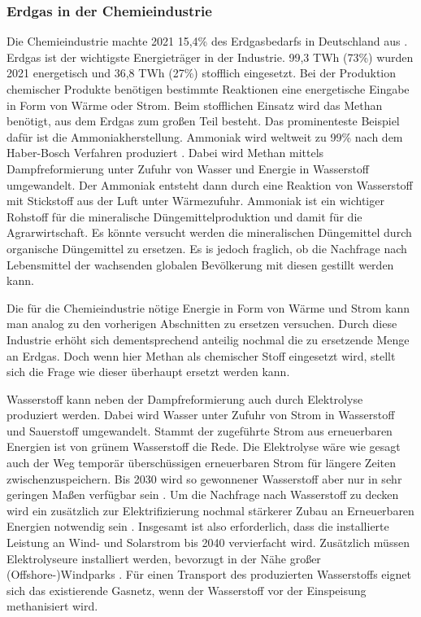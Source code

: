 \subsubsection{Erdgas in der Chemieindustrie}

Die Chemieindustrie machte 2021 15,4\% des Erdgasbedarfs in Deutschland aus \cite{vci2022}. Erdgas ist der wichtigste Energieträger in der Industrie. 99,3 TWh (73\%) wurden 2021 energetisch und 36,8 TWh (27\%) stofflich eingesetzt. Bei der Produktion chemischer Produkte benötigen bestimmte Reaktionen eine energetische Eingabe in Form von Wärme oder Strom. Beim stofflichen Einsatz wird das Methan benötigt, aus dem Erdgas zum großen Teil besteht. Das prominenteste Beispiel dafür ist die Ammoniakherstellung. Ammoniak wird weltweit zu 99\% nach dem Haber-Bosch Verfahren produziert \cite{smil}. Dabei wird Methan mittels Dampfreformierung unter Zufuhr von Wasser und Energie in Wasserstoff umgewandelt. Der Ammoniak entsteht dann durch eine Reaktion von Wasserstoff mit Stickstoff aus der Luft unter Wärmezufuhr. Ammoniak ist ein wichtiger Rohstoff für die mineralische Düngemittelproduktion und damit für die Agrarwirtschaft. Es könnte versucht werden die mineralischen Düngemittel durch organische Düngemittel zu ersetzen. Es is jedoch fraglich, ob die Nachfrage nach Lebensmittel der wachsenden globalen Bevölkerung mit diesen gestillt werden kann.

Die für die Chemieindustrie nötige Energie in Form von Wärme und Strom kann man analog zu den vorherigen Abschnitten zu ersetzen versuchen. Durch diese Industrie erhöht sich dementsprechend anteilig nochmal die zu ersetzende Menge an Erdgas. Doch wenn hier Methan als chemischer Stoff eingesetzt wird, stellt sich die Frage wie dieser überhaupt ersetzt werden kann.

Wasserstoff kann neben der Dampfreformierung auch durch Elektrolyse produziert werden. Dabei wird Wasser unter Zufuhr von Strom in Wasserstoff und Sauerstoff umgewandelt. Stammt der zugeführte Strom aus erneuerbaren Energien ist von grünem Wasserstoff die Rede. Die Elektrolyse wäre wie gesagt auch der Weg temporär überschüssigen erneuerbaren Strom für längere Zeiten zwischenzuspeichern. Bis 2030 wird so gewonnener Wasserstoff aber nur in sehr geringen Maßen verfügbar sein \cite{kopernikus}. Um die Nachfrage nach Wasserstoff zu decken wird ein zusätzlich zur Elektrifizierung nochmal stärkerer Zubau an Erneuerbaren Energien notwendig sein \cite{agora-wasserstoff}. Insgesamt ist also erforderlich, dass die installierte Leistung an Wind- und Solarstrom bis 2040 vervierfacht wird. 
Zusätzlich müssen Elektrolyseure installiert werden, bevorzugt in der Nähe großer (Offshore-)Windparks \cite{ei1}. Für einen Transport des produzierten Wasserstoffs eignet sich das existierende Gasnetz, wenn der Wasserstoff vor der Einspeisung methanisiert wird.

